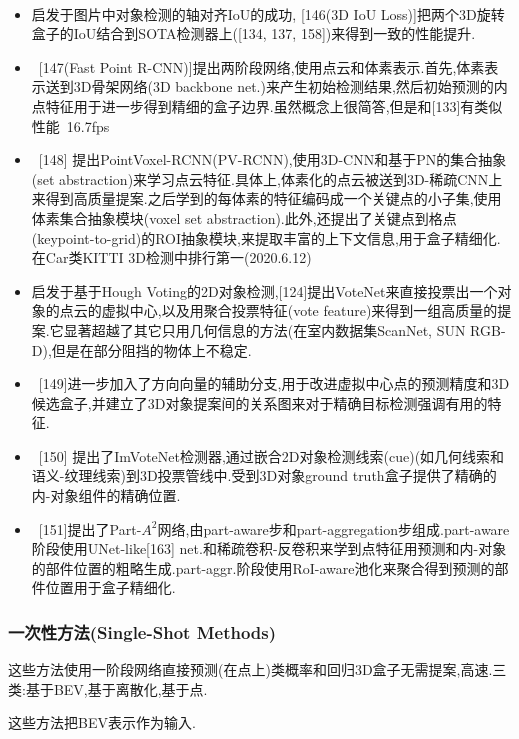 \documentclass{article}
\begin{document}
\ 

\begin{itemize}
    \item 启发于图片中对象检测的轴对齐IoU的成功, [146(3D IoU Loss)]把两个3D旋转盒子的IoU结合到SOTA检测器上([134, 137, 158])来得到一致的性能提升.
    \item \ [147(Fast Point R-CNN)]提出两阶段网络,使用点云和体素表示.首先,体素表示送到3D骨架网络(3D backbone net.)来产生初始检测结果,然后初始预测的内点特征用于进一步得到精细的盒子边界.虽然概念上很简答,但是和[133]有类似性能~16.7fps
    \item \ [148] 提出PointVoxel-RCNN(PV-RCNN),使用3D-CNN和基于PN的集合抽象(set abstraction)来学习点云特征.具体上,体素化的点云被送到3D-稀疏CNN上来得到高质量提案.之后学到的每体素的特征编码成一个关键点的小子集,使用体素集合抽象模块(voxel set abstraction).此外,还提出了关键点到格点(keypoint-to-grid)的ROI抽象模块,来提取丰富的上下文信息,用于盒子精细化. 在Car类KITTI 3D检测中排行第一(2020.6.12)
    \item 启发于基于Hough Voting的2D对象检测,[124]提出VoteNet来直接投票出一个对象的点云的虚拟中心,以及用聚合投票特征(vote feature)来得到一组高质量的提案.它显著超越了其它只用几何信息的方法(在室内数据集ScanNet, SUN RGB-D),但是在部分阻挡的物体上不稳定.
    \item \ [149]进一步加入了方向向量的辅助分支,用于改进虚拟中心点的预测精度和3D候选盒子,并建立了3D对象提案间的关系图来对于精确目标检测强调有用的特征.
    \item \ [150] 提出了ImVoteNet检测器,通过嵌合2D对象检测线索(cue)(如几何线索和语义-纹理线索)到3D投票管线中.受到3D对象ground truth盒子提供了精确的内-对象组件的精确位置.
    \item \ [151]提出了Part-$A^2$网络,由part-aware步和part-aggregation步组成.part-aware阶段使用UNet-like[163] net.和稀疏卷积-反卷积来学到点特征用预测和内-对象的部件位置的粗略生成.part-aggr.阶段使用RoI-aware池化来聚合得到预测的部件位置用于盒子精细化.
\end{itemize}

\subsubsection{一次性方法(Single-Shot Methods)}

这些方法使用一阶段网络直接预测(在点上)类概率和回归3D盒子\trarr 无需提案,高速.三类:基于BEV,基于离散化,基于点.

 这些方法把BEV表示作为输入.
\end{document}
